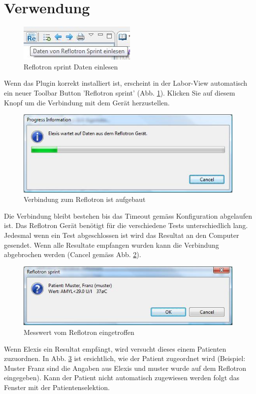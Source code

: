 \documentclass[a4paper]{scrartcl}
\begin{document}
\section{Verwendung}
\begin{figure}[h]
    \includegraphics{toolbarbutton}
    \caption{Reflotron sprint Daten einlesen}
    \label{fig:toolbarbutton}
\end{figure}
Wenn das Plugin korrekt installiert ist, erscheint in der Labor-View automatisch ein neuer Toolbar Button 'Reflotron sprint' (Abb. \ref{fig:toolbarbutton}). Klicken Sie auf diesem Knopf um die Verbindung mit dem Ger\"at herzustellen. 
\begin{figure}[h]
    \includegraphics{connected}
    \caption{Verbindung zum Reflotron ist aufgebaut}
    \label{fig:connected}
\end{figure}
Die Verbindung bleibt bestehen bis das Timeout gem\"ass Konfiguration abgelaufen ist. Das Reflotron Ger\"at ben\"otigt f\"ur die verschiedene Tests unterschiedlich lang. Jedesmal wenn ein Test abgeschlossen ist wird das Resultat an den Computer gesendet. Wenn alle Resultate empfangen wurden kann die Verbindung abgebrochen werden (Cancel gem\"ass Abb. \ref{fig:connected}).
\begin{figure}[h]
    \includegraphics{messwert}
    \caption{Messwert vom Reflotron eingetroffen}
    \label{fig:messwert}
\end{figure}
Wenn Elexis ein Resultat empf\"angt, wird versucht dieses einem Patienten zuzuordnen. In Abb. \ref{fig:messwert} ist ersichtlich, wie der Patient zugeordnet wird (Beispiel: Muster Franz sind die Angaben aus Elexis und muster wurde auf dem Reflotron eingegeben). Kann der Patient nicht automatisch zugewiesen werden folgt das Fenster mit der Patientenselektion.\\
\end{document}
